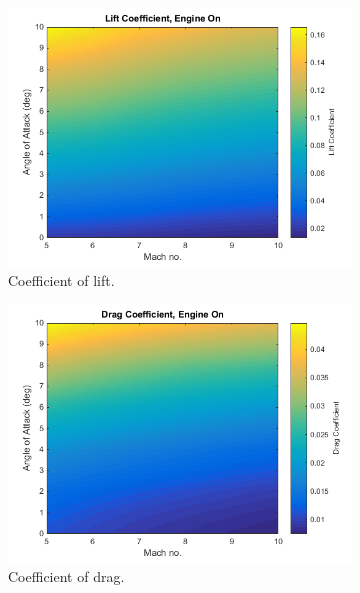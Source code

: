 		
		\begin{figure}[ht]
			\begin{subfigure}{.5\textwidth}
				\centering
				\includegraphics[width=0.99\linewidth]{figures/3_vehicle_design/Cl-EngineOn}
				\caption{Coefficient of lift.}
				\label{fig:Cl-EngineOn}
			\end{subfigure}
			\begin{subfigure}{.5\textwidth}
				\centering
				\includegraphics[width=0.99\linewidth]{figures/3_vehicle_design/Cd-EngineOn}
				\caption{Coefficient of drag.}
				\label{fig:Cd-EngineOn}
			\end{subfigure}
			\begin{subfigure}{.5\textwidth}
				\centering

\end{subfigure}
\end{figure}
